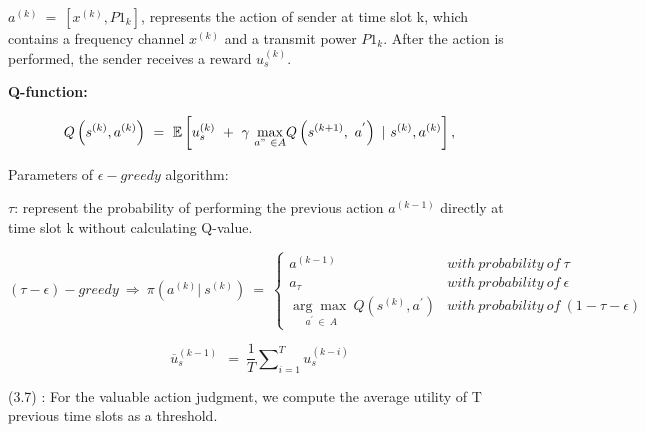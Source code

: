 \documentclass[letterpaper%
, twoside%
, 12pt%
,thesepararticles%
, english%
,creativecommons,hyperref, withAlgo2e%
]{thETS}
\begin{document}
$\displaystyle a^{( k)} \ =\ \left[ x^{( k)} ,P1_{k}\right]$, represents the action of sender at time slot k, which contains a frequency channel $\displaystyle x^{( k)}$ and a transmit power $\displaystyle P1_{k}$. After the action is performed, the sender receives a reward $\displaystyle u_{s}^{( k)}$.

\textbf{Q-function:}

\begin{equation}
Q\left( s^{( k)} ,a^{( k)}\right) \ =\ \mathbb{E}\left[ u_{s}^{( k)} \ +\ \gamma \ \underset{a"\ \in A}{\max} Q\left( s^{( k+1)} ,\ a^{'}\right) \ |\ s^{( k)} ,a^{( k)}\right] ,
\end{equation}

Parameters of $\displaystyle \epsilon -greedy$ algorithm: 

$\displaystyle \tau $: represent the probability of performing the previous action $\displaystyle a^{( k-1)}$ directly at time slot k without calculating Q-value.

\begin{equation}
( \tau -\epsilon ) -greedy\ \Longrightarrow \ \pi \left( a^{( k)} |\ s^{( k)}\right) \ =\ \begin{cases}
a^{( k-1)} & with\ probability\ of\ \tau \\
a_{\tau } & with\ probability\ of\ \epsilon \\
\underset{a^{'} \ \in \ A}{\arg\max \ } Q\left( s^{( k)} ,a^{'}\right) & with\ probability\ of\ ( 1-\tau -\epsilon )
\end{cases}
\end{equation}


\begin{equation}
\overline{u}_{s}^{( k-1)} \ \ =\ \frac{1}{T}\sum\nolimits _{i=1}^{T} u_{s}^{( k-i)}
\end{equation}

(3.7) : For the valuable action judgment, we compute the average utility of T previous time slots as a threshold.
\end{document}

